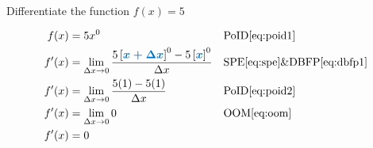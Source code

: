\documentclass[20150903-160354-rs2.2-MarksMathNotebook.tex]{subfiles}
\begin{document}
\begin{example}[id:20141219-212546] \label{20141219-212546} \hfill \\

Differentiate the function $f(x)=5$

\soln

\solnsteps
\begin{align*}
f(x) & = 5x^0 && \text{PoID} \eqref{eq:poid1} \\
f'(x) &= \displaystyle \lim_{\Delta x \to 0} \dfrac{5\farg{x+\Delta x}^0-5\farg{x}^0}{\Delta x} && \text{SPE} \eqref{eq:spe} \& \text{DBFP} \eqref{eq:dbfp1}\\
f'(x) &= \displaystyle \lim_{\Delta x \to 0} \dfrac {5(1)-5(1)}{\Delta x} && \text{PoID} \eqref{eq:poid2} \\
f'(x) &= \displaystyle \lim_{\Delta x \to 0} 0 && \text{OOM} \eqref{eq:oom} \\
f'(x) &= 0 %
\end{align*}

\end{example}
\end{document}
